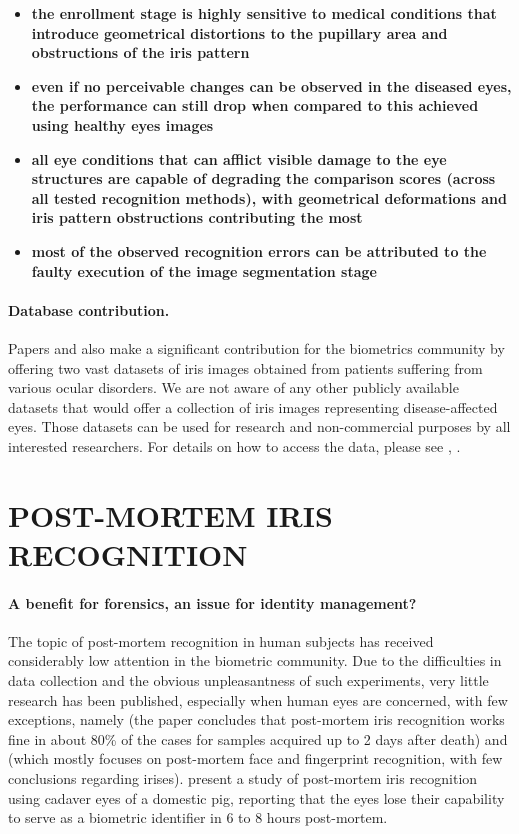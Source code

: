 \documentclass[a4paper,twoside]{article}
\begin{document}
\begin{itemize}
	\item {\bf the enrollment stage is highly sensitive to medical conditions that introduce geometrical distortions to the pupillary area and obstructions of the iris pattern}
	\item {\bf even if no perceivable changes can be observed in the diseased eyes, the performance can still drop when compared to this achieved using healthy eyes images}
	\item {\bf all eye conditions that can afflict visible damage to the eye structures are capable of degrading the comparison scores (across all tested recognition methods), with geometrical deformations and iris pattern obstructions contributing the most}
	\item {\bf most of the observed recognition errors can be attributed to the faulty execution of the image segmentation stage}
\end{itemize}

\paragraph{Database contribution.} Papers \cite{TrokielewiczCYBCONF2015} and \cite{TrokielewiczBTAS2015} also make a significant contribution for the biometrics community by offering two vast datasets of iris images obtained from patients suffering from various ocular disorders. We are not aware of any other publicly available datasets that would offer a collection of iris images representing disease-affected eyes. Those datasets can be used for research and non-commercial purposes by all interested researchers. For details on how to access the data, please see \cite{WarsawDiseaseIris1}, \cite{WarsawDiseaseIris2}.

\vfill

\section{\uppercase{Post-mortem iris recognition}}
\label{sec:ColdIris}
\paragraph{A benefit for forensics, an issue for identity management?}
The topic of post-mortem recognition in human subjects has received considerably low attention in the biometric community. Due to the difficulties in data collection and the obvious unpleasantness of such experiments, very little research has been published, especially when human eyes are concerned, with few exceptions, namely \cite{BostonPostMortem} (the paper concludes that post-mortem iris recognition works fine in about 80\% of the cases for samples acquired up to 2 days after death) and  \cite{PostMortemBoehnenBTAS16} (which mostly focuses on post-mortem face and fingerprint recognition, with few conclusions regarding irises). \cite{PostMortemPigs} present a study of post-mortem iris recognition using cadaver eyes of a domestic pig, reporting that the eyes lose their capability to serve as a biometric identifier in 6 to 8 hours post-mortem. 
\end{document}
